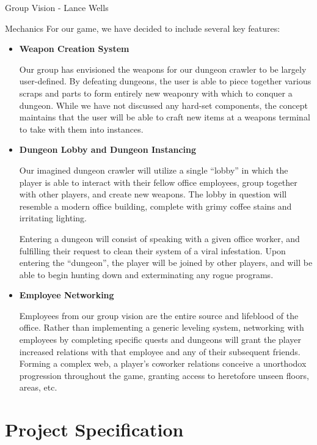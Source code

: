 \documentclass[12pt]{report}
\begin{document}
\begin{section}{Group Vision - Lance Wells}
\begin{subsection}{Mechanics}
For our game, we have decided to include several key features:

\begin{itemize}
\item \textbf{Weapon Creation System}

Our group has envisioned the weapons for our dungeon crawler to be 
largely user-defined. By defeating dungeons, the user is able to piece 
together various scraps and parts to form entirely new weaponry with 
which to conquer a dungeon. While we have not discussed any hard-set 
components, the concept maintains that the user will be able to craft 
new items at a weapons terminal to take with them into instances.

\item \textbf{Dungeon Lobby and Dungeon Instancing}

Our imagined dungeon crawler will utilize a single ``lobby'' in which the 
player is able to interact with their fellow office employees, group 
together with other players, and create new weapons. The lobby in question 
will resemble a modern office building, complete with grimy coffee stains 
and irritating lighting.

Entering a dungeon will consist of speaking with a given office worker, 
and fulfilling their request to clean their system of a viral infestation. 
Upon entering the ``dungeon'', the player will be joined by other players, 
and will be able to begin hunting down and exterminating any rogue programs.

\item \textbf{Employee Networking}

Employees from our group vision are the entire source and lifeblood of the 
office. Rather than implementing a generic leveling system, networking 
with employees by completing specific quests and dungeons will grant the 
player increased relations with that employee and any of their subsequent 
friends. Forming a complex web, a player's coworker relations conceive a 
unorthodox progression throughout the game, granting access to heretofore 
unseen floors, areas, etc.
\end{itemize}
\end{subsection}
\end{section}

\chapter{Project Specification}
\end{document}
